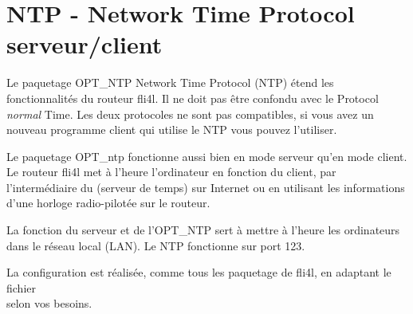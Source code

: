 
{
\section {NTP - Network Time Protocol serveur/client}
}

Le paquetage OPT\_NTP Network Time Protocol (NTP) étend les fonctionnalités
du routeur fli4l. Il ne doit pas être confondu avec le Protocol \emph{normal} Time.
Les deux protocoles ne sont pas compatibles, si vous avez un nouveau programme
client qui utilise le NTP vous pouvez l'utiliser.

Le paquetage OPT\_ntp fonctionne aussi bien en mode serveur qu'en mode client.
Le routeur fli4l met à l'heure l'ordinateur en fonction du client, par l'intermédiaire
du (serveur de temps) sur Internet ou en utilisant les informations d'une horloge
radio-pilotée sur le routeur.

La fonction du serveur et de l'OPT\_NTP sert à mettre à l'heure les ordinateurs
dans le réseau local (LAN). Le NTP fonctionne sur port 123.


La configuration est réalisée, comme tous les paquetage de fli4l, en adaptant
le fichier\\
 selon vos besoins.

